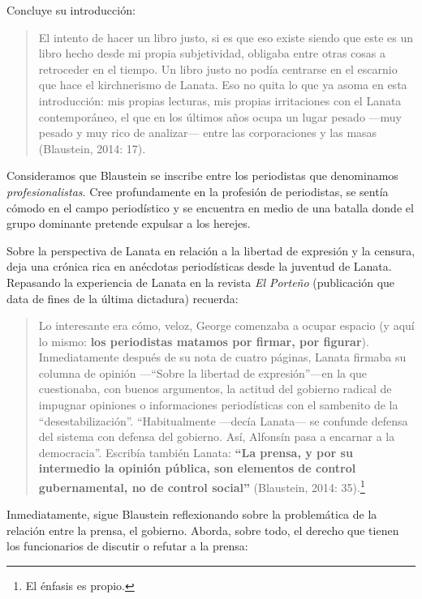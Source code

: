 Concluye su introducción:

\begin{quote}
El intento de hacer un libro justo, si es que eso existe siendo que este es un libro hecho desde mi propia subjetividad, obligaba entre otras cosas a retroceder en el tiempo. Un libro justo no podía centrarse en el escarnio que hace el kirchnerismo de Lanata. Eso no quita lo que ya asoma en esta introducción: mis propias lecturas, mis propias irritaciones con el Lanata contemporáneo, el que en los últimos años ocupa un lugar pesado ---muy pesado y muy rico de analizar--- entre las corporaciones y las masas (Blaustein, 2014: 17).
\end{quote}

Consideramos que Blaustein se inscribe entre los periodistas que denominamos \emph{profesionalistas}. Cree profundamente en la profesión de periodistas, se sentía cómodo en el campo periodístico y se encuentra en medio de una batalla donde el grupo dominante pretende expulsar a los herejes.

Sobre la perspectiva de Lanata en relación a la libertad de expresión y la censura, deja una crónica rica en anécdotas periodísticas desde la juventud de Lanata. Repasando la experiencia de Lanata en la revista \emph{El Porteño} (publicación que data de fines de la última dictadura) recuerda:

\begin{quote}
Lo interesante era cómo, veloz, George comenzaba a ocupar espacio (y aquí lo mismo: \textbf{los periodistas matamos por firmar, por figurar}). Inmediatamente después de su nota de cuatro páginas, Lanata firmaba su columna de opinión ---``Sobre la libertad de expresión''---en la que cuestionaba, con buenos argumentos, la actitud del gobierno radical de impugnar opiniones o informaciones periodísticas con el sambenito de la ``desestabilización''. ``Habitualmente ---decía Lanata--- se confunde defensa del sistema con defensa del gobierno. Así, Alfonsín pasa a encarnar a la democracia''. Escribía también Lanata: \textbf{``La prensa, y por su intermedio la opinión pública, son elementos de control gubernamental, no de control social''} (Blaustein, 2014: 35).\footnote{El énfasis es propio.}
\end{quote}

Inmediatamente, sigue Blaustein reflexionando sobre la problemática de la relación entre la prensa, el gobierno. Aborda, sobre todo, el derecho que tienen los funcionarios de discutir o refutar a la prensa:

